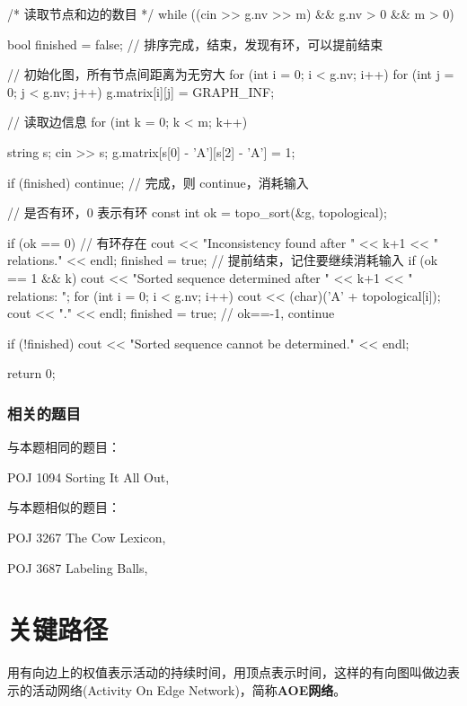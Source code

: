 \begin{Codex}[label=poj_1094.cpp]
{        /* 读取节点和边的数目 */
        while ((cin >> g.nv >> m) && g.nv > 0 && m > 0) {
            bool finished = false;  // 排序完成，结束，发现有环，可以提前结束

            // 初始化图，所有节点间距离为无穷大
            for (int i = 0; i < g.nv; i++)
                for (int j = 0; j < g.nv; j++)
                    g.matrix[i][j] = GRAPH_INF;

            // 读取边信息
            for (int k = 0; k < m; k++) {
                string s;
                cin >> s;
                g.matrix[s[0] - 'A'][s[2] - 'A'] = 1;

                if (finished) continue;    // 完成，则 continue，消耗输入

                // 是否有环，0 表示有环
                const int ok = topo_sort(&g, topological);

                if (ok == 0) {  // 有环存在
                    cout << "Inconsistency found after " << k+1 <<
                            " relations." << endl;
                    finished = true;  // 提前结束，记住要继续消耗输入
                }
                if (ok == 1 && k) {
                    cout << "Sorted sequence determined after " << k+1
                            << " relations: ";
                    for (int i = 0; i < g.nv; i++) {
                        cout << (char)('A' + topological[i]);
                    }
                    cout << "." << endl;
                    finished = true;
                }
                // ok==-1, continue
            }
            if (!finished) {
                cout << "Sorted sequence cannot be determined." << endl;
            }
        }
        return 0;
    }
\end{Codex}

\subsubsection{相关的题目}
与本题相同的题目：
\begindot
\item POJ 1094 Sorting It All Out, 
\myenddot

与本题相似的题目：
\begindot
\item POJ 3267 The Cow Lexicon, 
\item POJ 3687 Labeling Balls, 
\myenddot


\section{关键路径} %
用有向边上的权值表示活动的持续时间，用顶点表示时间，这样的有向图叫做边表示的活动网络(Activity On Edge Network)，简称\textbf{AOE网络}。

